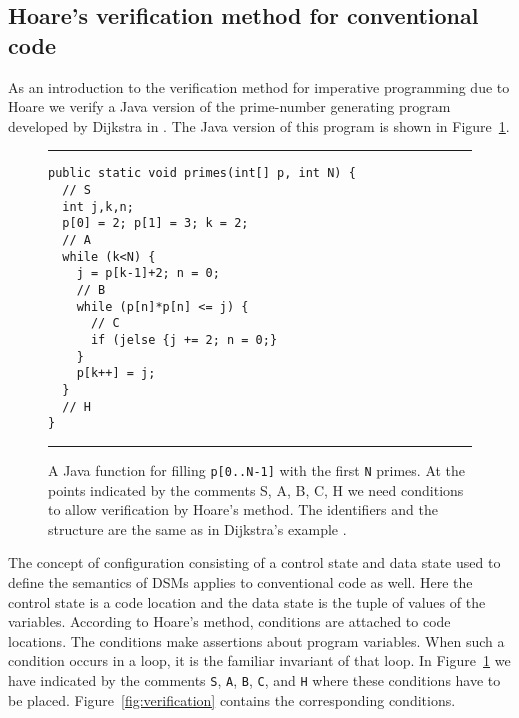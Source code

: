 \documentclass[preprint,11pt]{elsarticle}
\begin{document}
\subsection{Hoare's verification method for conventional code}

As an introduction to the verification method
for imperative programming due to Hoare \cite{hr69}
we verify a Java version of the prime-number
generating program
developed by Dijkstra in \cite{djkddh72}.
The Java version of this program is shown in Figure~\ref{fig:floyd}.

\begin{figure}[htbp]
\begin{center}
\hrule \vspace{0.1in}
{\footnotesize
\begin{verbatim}
public static void primes(int[] p, int N) {
  // S
  int j,k,n;
  p[0] = 2; p[1] = 3; k = 2;
  // A
  while (k<N) {
    j = p[k-1]+2; n = 0;
    // B
    while (p[n]*p[n] <= j) {
      // C
      if (jelse {j += 2; n = 0;}
    }
    p[k++] = j;
  }
  // H
}
\end{verbatim}
} \end{center}
\caption{\label{fig:floyd}
A Java function for filling
{\tt p[0..N-1]} with the first {\tt N} primes.
At the points indicated by the comments S, A, B, C, H
we need conditions to allow verification by Hoare's method.
The identifiers and the structure
are the same as in Dijkstra's example \cite{djkddh72}.
}
\vspace{0.1in}
\hrule
\end{figure}

The concept of configuration consisting
of a control state and data state
used to define the semantics of DSMs applies to conventional
code as well.
Here the control state is a code location
and the data state is the tuple of values of the variables.
According to Hoare's method,
conditions are attached to code locations.
The conditions make assertions about
program variables.
When such a condition occurs in a loop,
it is the familiar invariant of that loop.
In Figure~\ref{fig:floyd} we have indicated by the comments
\verb"S",
\verb"A",
\verb"B",
\verb"C", and
\verb"H"
where these conditions have to be placed. 
Figure~\ref{fig:verification} contains the corresponding
conditions.
\end{document}
